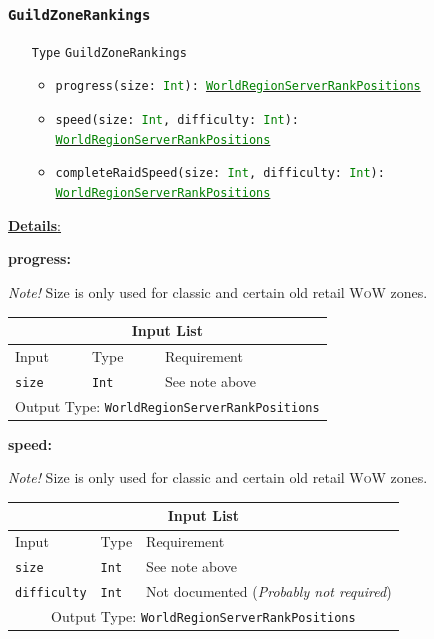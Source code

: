 \documentclass[10pt, a4paper]{memoir}
\numberwithin{equation}{section}
\theoremstyle{plain}
\theoremstyle{defp}
\theoremstyle{dotless}
\theoremstyle{definition}
\theoremstyle{dotless}
\theoremstyle{dotless}
\theoremstyle{defp}
\theoremstyle{defp}
\theoremstyle{be}          %
\theoremstyle{defp}
\newcommand\ttt[1]{\texttt{#1}}
\newcommand\tsc[1]{\textsc{#1}}
\newcommand\type[1]{\ttt{\textcolor{green}{#1}}}
\begin{document}
\subsubsection{\ttt{GuildZoneRankings}}\label{sec:GuildZoneRankings}

\begin{itemize}[noitemsep,topsep=1pt]
\item[\ttt{Type}] \ttt{GuildZoneRankings}
\begin{itemize}[itemsep=1pt,topsep=1pt]
\item \ttt{progress(size: \type{Int}): \hyperref[sec:WorldRegionServerRankPositions]{\type{WorldRegionServerRankPositions}}}
\item \ttt{speed(size: \type{Int}, difficulty: \type{Int}): \hyperref[sec:WorldRegionServerRankPositions]{\type{WorldRegionServerRankPositions}}}
\item \ttt{completeRaidSpeed(size: \type{Int}, difficulty: \type{Int}): \hyperref[sec:WorldRegionServerRankPositions]{\type{WorldRegionServerRankPositions}}}
\end{itemize}
\end{itemize}

\underline{\textbf{Details}:}

\textbf{progress:}

\textit{Note!} Size is only used for classic and certain old retail \tsc{WoW} zones.

\begin{table}[h!]
	\centering
	\begin{tabular}{ |p{4.2cm}|p{6cm}|p{3cm}|  }
		\hline
		\multicolumn{3}{|c|}{Input List} \\
		\hline
		Input & Type & Requirement\\
		\hline
		\ttt{size} & \ttt{Int} & See note above\\
		\hline
		\multicolumn{3}{|c|}{Output Type: \ttt{WorldRegionServerRankPositions}} \\
		\hline
	\end{tabular}
\end{table}

\newpage

\textbf{speed:}

\textit{Note!} Size is only used for classic and certain old retail \tsc{WoW} zones.

\begin{table}[h!]
	\centering
	\begin{tabular}{ |p{4.2cm}|p{6cm}|p{3cm}|  }
		\hline
		\multicolumn{3}{|c|}{Input List} \\
		\hline
		Input & Type & Requirement\\
		\hline
		\ttt{size} & \ttt{Int} & See note above\\
		\ttt{difficulty} & \ttt{Int} & Not documented (\textit{Probably not required})\\
		\hline
		\multicolumn{3}{|c|}{Output Type: \ttt{WorldRegionServerRankPositions}} \\
		\hline
	\end{tabular}
\end{table}
\end{document}
